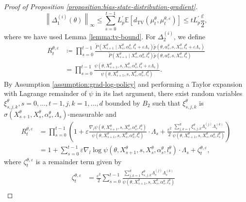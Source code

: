 \documentclass[11pt]{article}
\numberwithin{equation}{section}
\theoremstyle{definition}
\theoremstyle{remark}
\def\eps{\varepsilon}
\def\tv{\mathrm{TV}}
\begin{document}
\begin{proof}[Proof of Proposition \ref{proposition:bias-state-distribution-gradient}]
\[
\left\| \Delta_1^{(i)}(\theta) \right\|_\infty \leq  \sum_{s=0}^{t-1} L^\prime_p \mathbb E \left[d_\tv \left(\mu_t^\theta, \mu_t^{\theta, \eps}\right)\right] \leq t L^\prime_p \frac{\eps}{2},
\]
where we have used Lemma \ref{lemma:tv-bound}.
For $\Delta_2^{(i)}$, we define
\begin{equation}
    \label{eq:likelihood-ratio-t}
\begin{aligned}
    R_{t}^{\theta, \eps} &\coloneq \prod_{s = 0}^{t-1} \frac{\tilde P (X^\theta_{s+1} \mid X^\theta_s, \alpha_s^\theta, l_s^\theta + \eps \Lambda_s)\tilde p (\theta, \alpha_s^\theta, s,X_s^\theta,l_s^\theta + \eps \Lambda_s)}{\tilde P (X^\theta_{s+1} \mid X^\theta_s, \alpha_s^\theta, l_s^\theta )\tilde p (\theta, \alpha_s^\theta,s, X_s^\theta,l_s^\theta )} \\
    &= \prod_{s=0}^{t-1} \frac{\psi(\theta, X^\theta_{s+1}, s,X^\theta_s, \alpha_s^\theta, l_s^\theta + \eps \Lambda_s)}{\psi(\theta, X^\theta_{s+1}, s,X^\theta_s, \alpha_s^\theta, l_s^\theta)}.    
\end{aligned}
\end{equation}
By Assumption \ref{assumption:grad-log-policy} and performing a Taylor expansion with Lagrange remainder of $\psi$ in its last argument,
there exist random variables $\xi^\theta_{s,j,k}, s = 0, \ldots, t-1, j,k = 1, \ldots, d$ bounded by $B_2$ such that $\xi^\theta_{s,j,k}$ is $\sigma(X^\theta_{s+1}, X^\theta_s, \alpha_s^\theta, \Lambda_s)$-measurable and
\begin{equation}
    \label{eq:likelihood-ratio-expansion}
\begin{aligned}
R_{t}^{\theta, \eps} &= \prod_{s=0}^{t-1} \left(1 + \eps \frac{\nabla_l \psi(\theta, X^\theta_{s + 1}, s,X_s^\theta, \alpha_s^\theta, l_s^\theta)}{\psi(\theta, X^\theta_{s + 1}, s,X_s^\theta, \alpha_s^\theta, l_s^\theta)} \cdot \Lambda_s 
+ \frac{\eps^2}{2} \frac{\sum_{j,k=1}^d \xi^\theta_{s,j,k} \Lambda_s^{(j)} \Lambda_s^{(k)}}{\psi(\theta, X_{s + 1}^\theta, s,X_s^\theta, \alpha_s^\theta, l_s^\theta)}\right) \\
&= 1 + \sum_{s=0}^{t-1} \eps \nabla_l \log \psi(\theta, X^\theta_{s + 1},s, X_s^\theta, \alpha_s^\theta, l_s^\theta) \cdot \Lambda_s + \zeta_t^{\theta,\eps},
\end{aligned}
\end{equation}
where $\zeta_t^{\theta,\eps}$ is a remainder term given by
\begin{equation}
    \label{eq:remainder-term-likelihood-ratio}
\begin{aligned}
\zeta_t^{\theta, \eps} &= \frac{\eps^2}{2}\sum_{s=0}^{t-1} \frac{\sum_{j,k=1}^d \xi^\theta_{s,j,k} \Lambda_s^{(j)} \Lambda_s^{(k)}}{\psi(\theta, X_{s + 1}^\theta, s,X_s^\theta, \alpha_s^\theta, l_s^\theta)}&\\

\end{aligned}
\end{equation}
\end{proof}
\end{document}
